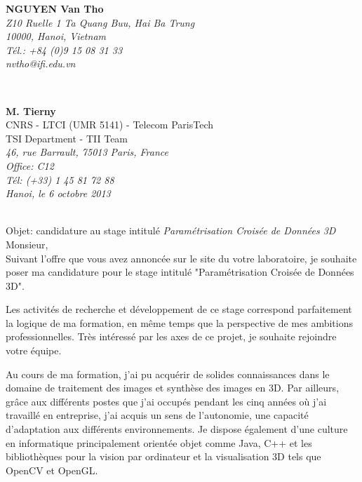 \documentclass[11pt]{report}
\begin{document}
\sffamily
%
\begin{minipage}[t]{.4\textwidth}
\raggedright
{\bfseries NGUYEN Van Tho}\\[.35ex]
\small\itshape
Z10 Ruelle 1 Ta Quang Buu, Hai Ba Trung \\
10000, Hanoi, Vietnam\\[.35ex]
Tél.: +84 (0)9 15 08 31 33\\
nvtho@ifi.edu.vn\\
\end{minipage}\\[1em]

%

\begin{minipage}[t]{1\textwidth}
	\begin{flushright}
		{\bfseries M. Tierny}\\[.35ex]
		CNRS - LTCI (UMR 5141) - Telecom ParisTech\\[.35ex]
		TSI Department - TII Team \\[.35ex]
		\small\itshape
		46, rue Barrault, 75013 Paris, France\\
		Office: C12\\
		Tél: (+33) 1 45 81 72 88 \\
		\normalfont Hanoi, le 6 octobre 2013\\
	\end{flushright}
\end{minipage}\\[0.9em]

Objet: candidature au stage intitulé \textit{ Paramétrisation Croisée de Données 
3D}\\[1em]
Monsieur,\\[1em]
Suivant l'offre que vous avez annoncée sur le site du votre laboratoire, je souhaite 
poser ma candidature pour le stage intitulé "Paramétrisation Croisée de Données 3D".

Les activités de recherche et développement de ce stage correspond parfaitement la 
logique de ma formation, en même temps que la perspective de mes ambitions 
professionnelles. Très intéressé par les axes de ce projet, je souhaite
rejoindre votre équipe.

Au cours de ma formation, j'ai pu acquérir de solides connaissances dans le domaine de 
traitement des images et synthèse des images en 3D. Par ailleurs, grâce aux 
différents postes que j'ai occupés pendant les cinq années où j'ai travaillé en 
entreprise, j'ai acquis un sens de l'autonomie, une capacité d'adaptation aux différents 
environnements. Je dispose également d'une culture en informatique principalement orientée 
objet comme Java, C++ et les bibliothèques pour la vision par ordinateur et la 
visualisation 3D tels que OpenCV et OpenGL.
\end{document}

